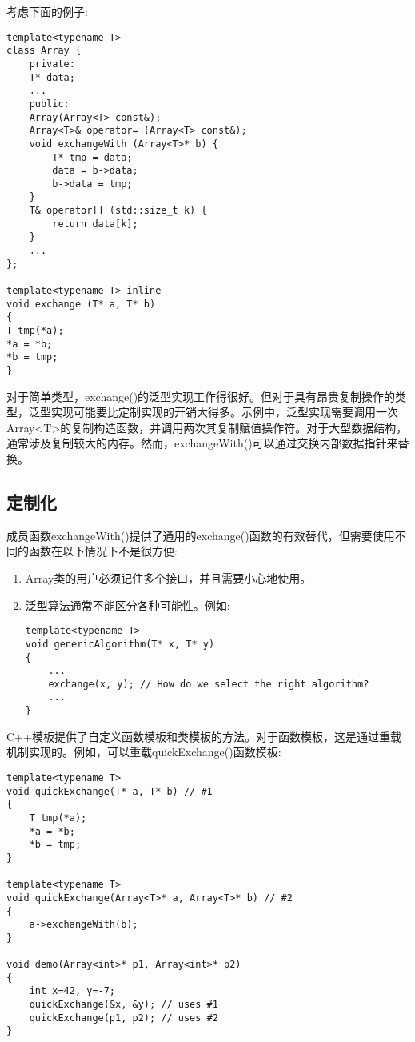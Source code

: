 
考虑下面的例子:

\begin{lstlisting}[style=styleCXX]
template<typename T>
class Array {
	private:
	T* data;
	...
	public:
	Array(Array<T> const&);
	Array<T>& operator= (Array<T> const&);
	void exchangeWith (Array<T>* b) {
		T* tmp = data;
		data = b->data;
		b->data = tmp;
	}
	T& operator[] (std::size_t k) {
		return data[k];
	}
	...
};

template<typename T> inline
void exchange (T* a, T* b)
{
T tmp(*a);
*a = *b;
*b = tmp;
}
\end{lstlisting}

对于简单类型，exchange()的泛型实现工作得很好。但对于具有昂贵复制操作的类型，泛型实现可能要比定制实现的开销大得多。示例中，泛型实现需要调用一次Array<T>的复制构造函数，并调用两次其复制赋值操作符。对于大型数据结构，通常涉及复制较大的内存。然而，exchangeWith()可以通过交换内部数据指针来替换。

\subsection{定制化}

成员函数exchangeWith()提供了通用的exchange()函数的有效替代，但需要使用不同的函数在以下情况下不是很方便:

\begin{enumerate}
\item 
Array类的用户必须记住多个接口，并且需要小心地使用。

\item 
泛型算法通常不能区分各种可能性。例如:

\begin{lstlisting}[style=styleCXX]
template<typename T>
void genericAlgorithm(T* x, T* y)
{
	...
	exchange(x, y); // How do we select the right algorithm?
	...
}
\end{lstlisting}

\end{enumerate}

C++模板提供了自定义函数模板和类模板的方法。对于函数模板，这是通过重载机制实现的。例如，可以重载quickExchange()函数模板:

\begin{lstlisting}[style=styleCXX]
template<typename T>
void quickExchange(T* a, T* b) // #1
{
	T tmp(*a);
	*a = *b;
	*b = tmp;
}

template<typename T>
void quickExchange(Array<T>* a, Array<T>* b) // #2
{
	a->exchangeWith(b);
}

void demo(Array<int>* p1, Array<int>* p2)
{
	int x=42, y=-7;
	quickExchange(&x, &y); // uses #1
	quickExchange(p1, p2); // uses #2
}
\end{lstlisting}

